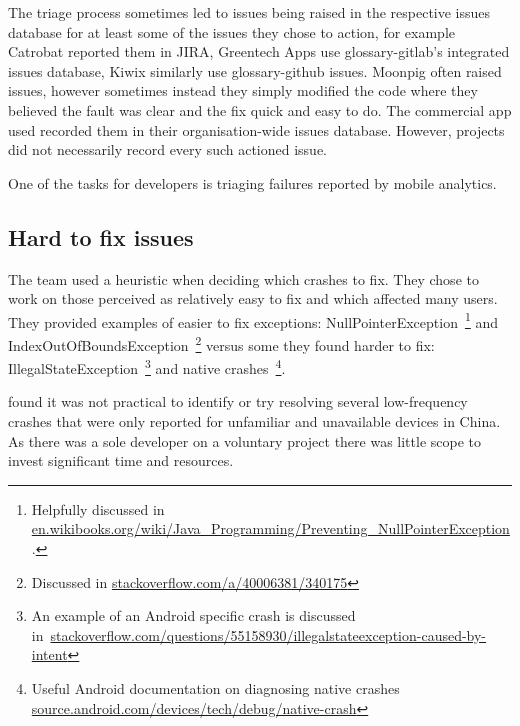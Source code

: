 The triage process sometimes led to issues being raised in the respective issues database for at least some of the issues they chose to action, for example Catrobat reported them in JIRA, Greentech Apps use \Gls{glossary-gitlab}'s integrated issues database, Kiwix similarly use \gls{glossary-github} issues. Moonpig often raised issues, however sometimes instead they simply modified the code where they believed the fault was clear and the fix quick and easy to do. The commercial app used recorded them in their organisation-wide issues database. However, projects did not necessarily record every such actioned issue. 

One of the tasks for developers is triaging failures reported by mobile analytics. 

\subsection{Hard to fix issues}
The  team used a heuristic when deciding which crashes to fix. They chose to work on those perceived as relatively easy to fix and which affected many users. They provided examples of easier to fix exceptions: NullPointerException~\footnote{Helpfully discussed in \href{https://en.wikibooks.org/wiki/Java\_Programming/Preventing\_NullPointerException}{en.wikibooks.org/wiki/Java\_Programming/Preventing\_NullPointerException}.} and IndexOutOfBoundsException~\footnote{Discussed in \href{https://stackoverflow.com/a/40006381/340175}{stackoverflow.com/a/40006381/340175}} versus some they found harder to fix: IllegalStateException~\footnote{An example of an Android specific crash is discussed in~\href{https://stackoverflow.com/questions/55158930/illegalstateexception-caused-by-intent}{stackoverflow.com/questions/55158930/illegalstateexception-caused-by-intent}} and native crashes~\footnote{Useful Android documentation on diagnosing native crashes \href{https://source.android.com/devices/tech/debug/native-crash}{source.android.com/devices/tech/debug/native-crash}}.

 found it was not practical to identify or try resolving several low-frequency crashes that were only reported for unfamiliar and unavailable devices in China. As there was a sole developer on a voluntary project there was little scope to invest significant time and resources.

